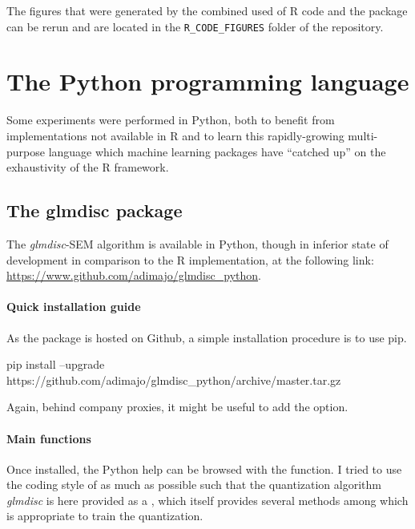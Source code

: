 The figures that were generated by the combined used of \textsf{R} code and the  package can be rerun and are located in the \verb|R_CODE_FIGURES| folder of the repository.

\section{The Python programming language}

Some experiments were performed in Python, both to benefit from implementations not available in \textsf{R} and to learn this rapidly-growing multi-purpose language which machine learning packages have ``catched up'' on the exhaustivity of the \textsf{R} framework.

\subsection{The glmdisc package}

The \textit{glmdisc}-SEM algorithm is available in Python, though in inferior state of development in comparison to the \textsf{R} implementation, at the following link: \url{https://www.github.com/adimajo/glmdisc_python}.

\paragraph{Quick installation guide}

As the package is hosted on Github, a simple installation procedure is to use pip.

\begin{bashlisting}
pip install --upgrade https://github.com/adimajo/glmdisc_python/archive/master.tar.gz
\end{bashlisting}

Again, behind company proxies, it might be useful to add the  option.

\paragraph{Main functions}

Once installed, the Python help can be browsed with the  function. I tried to use the coding style of  as much as possible such that the quantization algorithm \textit{glmdisc} is here provided as a , which itself provides several methods among which  is appropriate to train the quantization.

